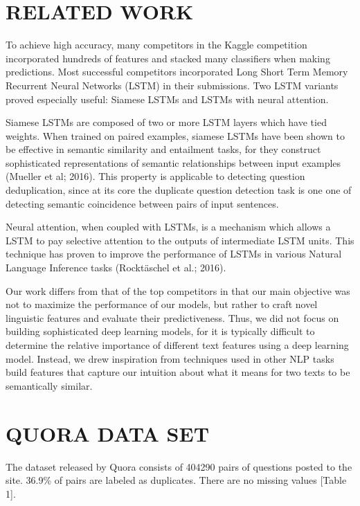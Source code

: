 \documentclass[letterpaper, 10 pt, conference]{ieeeconf}  %
\begin{document}
\section{RELATED WORK}

To achieve high accuracy, many competitors in the Kaggle competition incorporated hundreds of features and stacked many classifiers when making predictions. Most successful competitors incorporated Long Short Term Memory Recurrent Neural Networks (LSTM) in their submissions. Two LSTM variants proved especially useful: Siamese LSTMs and LSTMs with neural attention.

Siamese LSTMs are composed of two or more LSTM layers which have tied weights. When trained on paired examples, siamese LSTMs have been shown to be effective in semantic similarity and entailment tasks, for they construct sophisticated representations of semantic relationships between input examples (Mueller et al; 2016). This property is applicable to detecting question deduplication, since at its core the duplicate question detection task is one one of detecting semantic coincidence between pairs of input sentences.

Neural attention, when coupled with LSTMs, is a mechanism which allows a LSTM to pay selective attention to the outputs of intermediate LSTM units. This technique has proven to improve the performance of LSTMs in various Natural Language Inference tasks (Rocktäschel et al.; 2016).

Our work differs from that of the top competitors in that our main objective was not to maximize the performance of our models, but rather to craft novel linguistic features and evaluate their predictiveness. Thus, we did not focus on building sophisticated deep learning models, for it is typically difficult to determine the relative importance of different text features using a deep learning model. Instead, we drew inspiration from techniques used in other NLP tasks build features that capture our intuition about what it means for two texts to be semantically similar.


\section{QUORA DATA SET}

The dataset released by Quora consists of 404290 pairs of questions posted to the site. 36.9\% of pairs are labeled as duplicates. There are no missing values [Table 1].  
\end{document}
